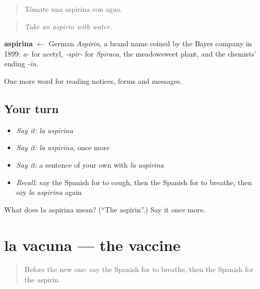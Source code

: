 \begin{quote}
Tómate una aspirina con agua.
\end{quote}

\begin{quote}
\emph{Take an aspirin with water.}
\end{quote}

\begin{cousinweb}
\textbf{aspirina} $\leftarrow$ German \emph{Aspirin}, a brand name coined by the Bayer company in 1899: \emph{a-} for acetyl, \emph{-spir-} for \emph{Spiraea}, the meadowsweet plant, and the chemists' ending \emph{-in}.
\end{cousinweb}

\begin{grammarlens}[title={What you've built}]
One more word for reading notices, forms and messages.
\end{grammarlens}

\subsection*{Your turn}
\begin{itemize}
\raggedright
  \item \emph{Say it:} \emph{la aspirina}
  \item \emph{Say it:} \emph{la aspirina}, once more
  \item \emph{Say it:} a sentence of your own with \emph{la aspirina}
  \item \emph{Recall:} say the Spanish for to cough, then the Spanish for to breathe, then say \emph{la aspirina} again
\end{itemize}

\begin{tcolorbox}[breakable,colback=teal!4,colframe=teal!35!black,title={Before you move on}]
What does la aspirina mean? (\textquotedblleft{}The aspirin\textquotedblright{}.) Say it once more.
\end{tcolorbox}
\section[la vacuna]{la vacuna — the vaccine}

\label{lesson:ES-C486-vacuna}



\begin{quote}
Before the new one: say the Spanish for to breathe, then the Spanish for the aspirin.
\end{quote}

